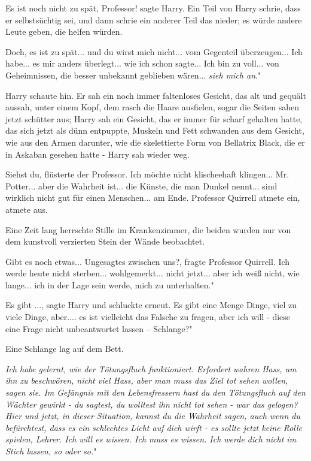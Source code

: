 \glqq Es ist noch nicht zu spät, Professor!\grqq{} sagte Harry. Ein Teil von
Harry schrie, dass er selbstsüchtig sei, und dann schrie ein anderer Teil das
nieder; es würde andere Leute geben, die helfen würden.

\glqq Doch, es ist zu spät... und du wirst mich nicht... vom Gegenteil
überzeugen... Ich habe... es mir anders überlegt... wie ich schon sagte... Ich
bin zu voll... von Geheimnissen, die besser unbekannt geblieben wären...
\emph{sieh mich an}."

Harry schaute hin. Er sah ein noch immer faltenloses Gesicht, das alt und
gequält aussah, unter einem Kopf, dem rasch die Haare ausfielen, sogar die
Seiten sahen jetzt schütter aus; Harry sah ein Gesicht, das er immer für scharf
gehalten hatte, das sich jetzt als dünn entpuppte, Muskeln und Fett schwanden
aus dem Gesicht, wie aus den Armen darunter, wie die skelettierte Form von
Bellatrix Black, die er in Askaban gesehen hatte - Harry sah wieder weg.

\glqq Siehst du\grqq{}, flüsterte der Professor. \glqq Ich möchte nicht
klischeehaft klingen... Mr. Potter... aber die Wahrheit ist... die Künste, die
man Dunkel nennt... sind wirklich nicht gut für einen Menschen... am
Ende.\grqq{} Professor Quirrell atmete ein, atmete aus.

Eine Zeit lang herrschte Stille im Krankenzimmer, die beiden wurden nur von dem
kunstvoll verzierten Stein der Wände beobachtet.

\glqq Gibt es noch etwas... Ungesagtes zwischen uns?\grqq{}, fragte Professor
Quirrell. \glqq Ich werde heute nicht sterben... wohlgemerkt... nicht jetzt...
aber ich weiß nicht, wie lange... ich in der Lage sein werde, mich zu
unterhalten."

\glqq Es gibt ...\grqq{}, sagte Harry und schluckte erneut. \glqq Es gibt eine
Menge Dinge, viel zu viele Dinge, aber.... es ist vielleicht das Falsche zu
fragen, aber ich will - diese eine Frage nicht unbeantwortet lassen – Schlange?"

Eine Schlange lag auf dem Bett.

\glqq \emph{Ich habe gelernt, wie der Tötungsfluch funktioniert. Erfordert
wahren Hass, um ihn zu beschwören, nicht viel Hass, aber man muss das Ziel tot
sehen wollen, sagen sie. Im Gefängnis mit den Lebensfressern hast du den
Tötungsfluch auf den Wächter gewirkt - du sagtest, du wolltest ihn nicht tot
sehen - war das gelogen? Hier und jetzt, in dieser Situation, kannst du die
Wahrheit sagen, auch wenn du befürchtest, dass es ein schlechtes Licht auf dich
wirft - es sollte jetzt keine Rolle spielen, Lehrer. Ich will es wissen. Ich
muss es wissen. Ich werde dich nicht im Stich lassen, so oder so.}"

